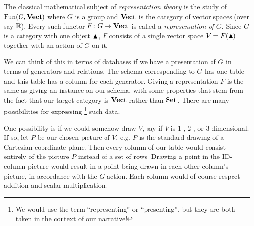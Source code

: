 \documentclass[CT4S-EN-RU]{subfiles}
\begin{document}
\begin{exerciseRUS}   
\end{exerciseRUS}


\subsection{}


\subsubsection{}\label{ex:reps of groups}

\begin{blockENG}
The classical mathematical subject of {\em representation theory} is the study of $\textnormal{Fun}(G,{\mathbf{Vect}})$ where $G$ is a group and ${\mathbf{Vect}}$ is the category of vector spaces (over say ${\mathbb R}$). Every such functor $F\colon G\rightarrow{\mathbf{Vect}}$ is called a {\em representation of $G$}. Since $G$ is a category with one object $\blacktriangle$, $F$ consists of a single vector space $V=F(\blacktriangle)$ together with an action of $G$ on it. 
\end{blockENG}

\begin{blockRUS}
\end{blockRUS}

\begin{blockENG}
We can think of this in terms of databases if we have a presentation of $G$ in terms of generators and relations. The schema corresponding to $G$ has one table and this table has a column for each generator. Giving a representation $F$ is the same as giving an instance on our schema, with some properties that stem from the fact that our target category is ${\mathbf{Vect}}$ rather than ${\mathbf{Set}}$. There are many possibilities for expressing
\footnote{We would use the term “representing” or “presenting”, but they are both taken in the context of our narrative!}
such data.
\end{blockENG}

\begin{blockRUS}
\end{blockRUS}

\begin{blockENG}
One possibility is if we could somehow draw $V$, say if $V$ is 1-, 2-, or 3-dimensional. If so, let $P$ be our chosen picture of $V$, e.g. $P$ is the standard drawing of a Cartesian coordinate plane. Then every column of our table would consist entirely of the picture $P$ instead of a set of rows. Drawing a point in the ID-column picture would result in a point being drawn in each other column's picture, in accordance with the $G$-action. Each column would of course respect addition and scalar multiplication.
\end{blockENG}
\end{document}
